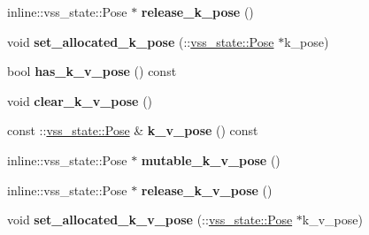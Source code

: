 \begin{DoxyCompactItemize}
\item 
inline\+::vss\+\_\+state\+::\+Pose $\ast$ {\bfseries release\+\_\+k\+\_\+pose} ()\hypertarget{classvss__state_1_1Robot__State_aadc71d6c4cdd034e934ad365e333f11c}{}\label{classvss__state_1_1Robot__State_aadc71d6c4cdd034e934ad365e333f11c}

\item 
void {\bfseries set\+\_\+allocated\+\_\+k\+\_\+pose} (\+::\hyperlink{classvss__state_1_1Pose}{vss\+\_\+state\+::\+Pose} $\ast$k\+\_\+pose)\hypertarget{classvss__state_1_1Robot__State_a4d69689931c42cfc30b748e267674d99}{}\label{classvss__state_1_1Robot__State_a4d69689931c42cfc30b748e267674d99}

\item 
bool {\bfseries has\+\_\+k\+\_\+v\+\_\+pose} () const \hypertarget{classvss__state_1_1Robot__State_a9a83b1c1730126c70d7d9e72bd9309b8}{}\label{classvss__state_1_1Robot__State_a9a83b1c1730126c70d7d9e72bd9309b8}

\item 
void {\bfseries clear\+\_\+k\+\_\+v\+\_\+pose} ()\hypertarget{classvss__state_1_1Robot__State_a72c6e0df54535999e45d050ae93e696f}{}\label{classvss__state_1_1Robot__State_a72c6e0df54535999e45d050ae93e696f}

\item 
const \+::\hyperlink{classvss__state_1_1Pose}{vss\+\_\+state\+::\+Pose} \& {\bfseries k\+\_\+v\+\_\+pose} () const \hypertarget{classvss__state_1_1Robot__State_a0a9ad2ef6674cccffbacad19391d04ec}{}\label{classvss__state_1_1Robot__State_a0a9ad2ef6674cccffbacad19391d04ec}

\item 
inline\+::vss\+\_\+state\+::\+Pose $\ast$ {\bfseries mutable\+\_\+k\+\_\+v\+\_\+pose} ()\hypertarget{classvss__state_1_1Robot__State_a75c61cf61895be92975d7cbbb96e9a2b}{}\label{classvss__state_1_1Robot__State_a75c61cf61895be92975d7cbbb96e9a2b}

\item 
inline\+::vss\+\_\+state\+::\+Pose $\ast$ {\bfseries release\+\_\+k\+\_\+v\+\_\+pose} ()\hypertarget{classvss__state_1_1Robot__State_a2d609ff6aaaa1093aa4fd1194c1e1d9c}{}\label{classvss__state_1_1Robot__State_a2d609ff6aaaa1093aa4fd1194c1e1d9c}

\item 
void {\bfseries set\+\_\+allocated\+\_\+k\+\_\+v\+\_\+pose} (\+::\hyperlink{classvss__state_1_1Pose}{vss\+\_\+state\+::\+Pose} $\ast$k\+\_\+v\+\_\+pose)\hypertarget{classvss__state_1_1Robot__State_adf1f7422433e9fa210b97a3a257dd5d3}{}\label{classvss__state_1_1Robot__State_adf1f7422433e9fa210b97a3a257dd5d3}


\end{DoxyCompactItemize}
